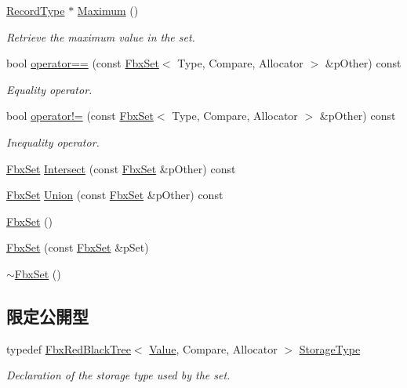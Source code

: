 \begin{DoxyCompactItemize}
\hyperlink{class_fbx_set_aa3934cd434a09288204f5e6c99b9cd01}{Record\+Type} $\ast$ \hyperlink{class_fbx_set_a81b244938a3b473b59d146336737f8ed}{Maximum} ()
\begin{DoxyCompactList}\small\item\em Retrieve the maximum value in the set. \end{DoxyCompactList}\item 
bool \hyperlink{class_fbx_set_a69388720587c95840cc36384f33a9484}{operator==} (const \hyperlink{class_fbx_set}{Fbx\+Set}$<$ Type, Compare, Allocator $>$ \&p\+Other) const
\begin{DoxyCompactList}\small\item\em Equality operator. \end{DoxyCompactList}\item 
bool \hyperlink{class_fbx_set_ab1734439d5a1bb4b4e2c6bd45b18ecd2}{operator!=} (const \hyperlink{class_fbx_set}{Fbx\+Set}$<$ Type, Compare, Allocator $>$ \&p\+Other) const
\begin{DoxyCompactList}\small\item\em Inequality operator. \end{DoxyCompactList}\item 
\hyperlink{class_fbx_set}{Fbx\+Set} \hyperlink{class_fbx_set_abea1a48c480a2f3ac236f8ff198fc2ce}{Intersect} (const \hyperlink{class_fbx_set}{Fbx\+Set} \&p\+Other) const
\item 
\hyperlink{class_fbx_set}{Fbx\+Set} \hyperlink{class_fbx_set_a2a1a03dffe4d1b40a04bd48e4b6b3c10}{Union} (const \hyperlink{class_fbx_set}{Fbx\+Set} \&p\+Other) const
\item 
\hyperlink{class_fbx_set_ae540e486ff517af7f865c8a1c499df79}{Fbx\+Set} ()
\item 
\hyperlink{class_fbx_set_a83bf0b02ec208241ffbc725db1d9c70d}{Fbx\+Set} (const \hyperlink{class_fbx_set}{Fbx\+Set} \&p\+Set)
\item 
\hyperlink{class_fbx_set_ace2b54de05237b1ad7223cb51a8f319a}{$\sim$\+Fbx\+Set} ()
\end{DoxyCompactItemize}
\subsection*{限定公開型}
\begin{DoxyCompactItemize}
\item 
typedef \hyperlink{class_fbx_red_black_tree}{Fbx\+Red\+Black\+Tree}$<$ \hyperlink{class_fbx_set_1_1_value}{Value}, Compare, Allocator $>$ \hyperlink{class_fbx_set_a6d908b9bc11d5418cd2fcceda1342e90}{Storage\+Type}
\begin{DoxyCompactList}\small\item\em Declaration of the storage type used by the set. \end{DoxyCompactList}\end{DoxyCompactItemize}


